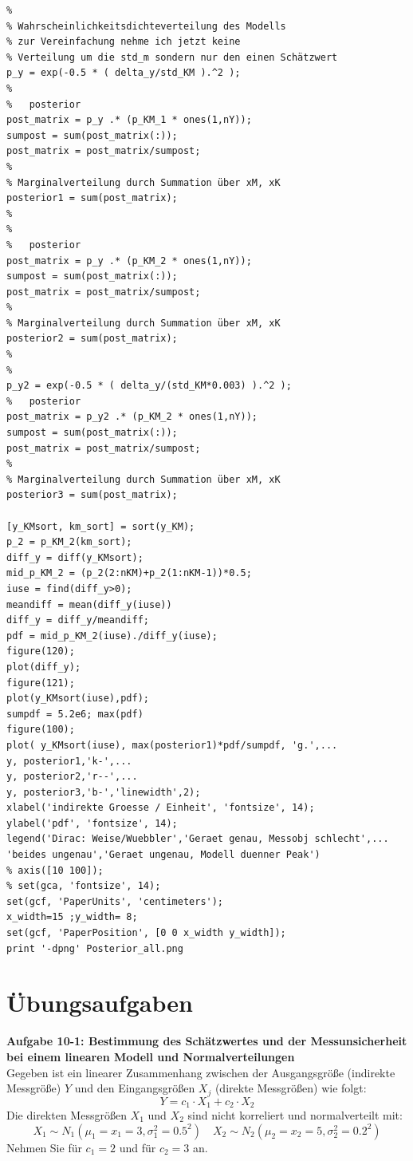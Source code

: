 \begin{verbatim}
%
% Wahrscheinlichkeitsdichteverteilung des Modells
% zur Vereinfachung nehme ich jetzt keine 
% Verteilung um die std_m sondern nur den einen Schätzwert
p_y = exp(-0.5 * ( delta_y/std_KM ).^2 );
%
%	posterior
post_matrix = p_y .* (p_KM_1 * ones(1,nY));
sumpost = sum(post_matrix(:));
post_matrix = post_matrix/sumpost;
%
% Marginalverteilung durch Summation über xM, xK
posterior1 = sum(post_matrix);
%
%
%	posterior
post_matrix = p_y .* (p_KM_2 * ones(1,nY));
sumpost = sum(post_matrix(:));
post_matrix = post_matrix/sumpost;
%
% Marginalverteilung durch Summation über xM, xK
posterior2 = sum(post_matrix);
%
%
p_y2 = exp(-0.5 * ( delta_y/(std_KM*0.003) ).^2 );
%	posterior
post_matrix = p_y2 .* (p_KM_2 * ones(1,nY));
sumpost = sum(post_matrix(:));
post_matrix = post_matrix/sumpost;
%
% Marginalverteilung durch Summation über xM, xK
posterior3 = sum(post_matrix);

[y_KMsort, km_sort] = sort(y_KM);
p_2 = p_KM_2(km_sort);
diff_y = diff(y_KMsort);
mid_p_KM_2 = (p_2(2:nKM)+p_2(1:nKM-1))*0.5;
iuse = find(diff_y>0);
meandiff = mean(diff_y(iuse))
diff_y = diff_y/meandiff;
pdf = mid_p_KM_2(iuse)./diff_y(iuse);
figure(120);
plot(diff_y);
figure(121);
plot(y_KMsort(iuse),pdf);
sumpdf = 5.2e6; max(pdf)
figure(100);
plot( y_KMsort(iuse), max(posterior1)*pdf/sumpdf, 'g.',...
y, posterior1,'k-',...
y, posterior2,'r--',...
y, posterior3,'b-','linewidth',2);
xlabel('indirekte Groesse / Einheit', 'fontsize', 14);
ylabel('pdf', 'fontsize', 14);
legend('Dirac: Weise/Wuebbler','Geraet genau, Messobj schlecht',...
'beides ungenau','Geraet ungenau, Modell duenner Peak')
% axis([10 100]);
% set(gca, 'fontsize', 14);
set(gcf, 'PaperUnits', 'centimeters');
x_width=15 ;y_width= 8;
set(gcf, 'PaperPosition', [0 0 x_width y_width]);
print '-dpng' Posterior_all.png
\end{verbatim}
\newpage
\section*{Übungsaufgaben}
\textbf{Aufgabe 10-1: Bestimmung des Schätzwertes und der Messunsicherheit bei
einem linearen Modell und Normalverteilungen}\\
Gegeben ist ein linearer Zusammenhang zwischen der Ausgangsgröße (indirekte
Messgröße) $Y$ und den Eingangsgrößen $X_j$ (direkte Messgrößen) wie folgt:
\[
Y = c_1 \cdot X_1 + c_2 \cdot X_2
\]
Die direkten Messgrößen $X_1$ und $X_2$ sind nicht korreliert und 
normalverteilt mit: 
\[
X_1 \sim N_{1}(\mu_1 =x_1=3,\sigma_1^2= 0.5^2 ) 
\quad X_2 \sim N_{2}(\mu_2=x_2= 5,\sigma_2^2=0.2^2 )
\]
Nehmen Sie für $c_1 = 2$ und für $c_2 = 3$ an. 

